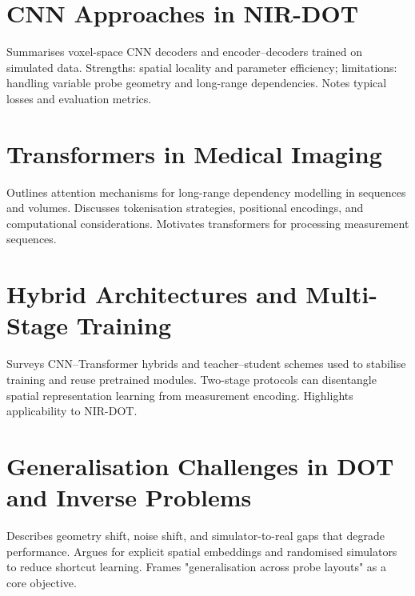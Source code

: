 \section{CNN Approaches in NIR-DOT}

Summarises voxel-space CNN decoders and encoder–decoders trained on simulated data. Strengths: spatial locality and parameter efficiency; limitations: handling variable probe geometry and long-range dependencies. Notes typical losses and evaluation metrics.


\section{Transformers in Medical Imaging}

Outlines attention mechanisms for long-range dependency modelling in sequences and volumes. Discusses tokenisation strategies, positional encodings, and computational considerations. Motivates transformers for processing measurement sequences.


\section{Hybrid Architectures and Multi-Stage Training}

Surveys CNN–Transformer hybrids and teacher–student schemes used to stabilise training and reuse pretrained modules. Two-stage protocols can disentangle spatial representation learning from measurement encoding. Highlights applicability to NIR-DOT.


\section{Generalisation Challenges in DOT and Inverse Problems}

Describes geometry shift, noise shift, and simulator-to-real gaps that degrade performance. Argues for explicit spatial embeddings and randomised simulators to reduce shortcut learning. Frames "generalisation across probe layouts" as a core objective.

